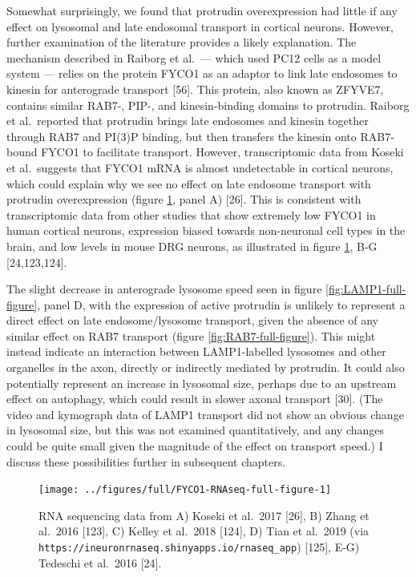 \documentclass[
  12pt,
  a4paper,
]{book}
\begin{document}
Somewhat surprisingly, we found that protrudin overexpression had little if any effect on lysosomal and late endosomal transport in cortical neurons. However, further examination of the literature provides a likely explanation. The mechanism described in Raiborg et al.~--- which used PC12 cells as a model system --- relies on the protein FYCO1 as an adaptor to link late endosomes to kinesin for anterograde transport {[}56{]}. This protein, also known as ZFYVE7, contains similar RAB7-, PIP-, and kinesin-binding domains to protrudin. Raiborg et al.~reported that protrudin brings late endosomes and kinesin together through RAB7 and PI(3)P binding, but then transfers the kinesin onto RAB7-bound FYCO1 to facilitate transport. However, transcriptomic data from Koseki et al.~suggests that FYCO1 mRNA is almost undetectable in cortical neurons, which could explain why we see no effect on late endosome transport with protrudin overexpression (figure \ref{fig:FYCO1-RNAseq-full-figure}, panel A) {[}26{]}. This is consistent with transcriptomic data from other studies that show extremely low FYCO1 in human cortical neurons, expression biased towards non-neuronal cell types in the brain, and low levels in mouse DRG neurons, as illustrated in figure \ref{fig:FYCO1-RNAseq-full-figure}, B-G {[}24,123,124{]}.

The slight decrease in anterograde lysosome speed seen in figure \ref{fig:LAMP1-full-figure}, panel D, with the expression of active protrudin is unlikely to represent a direct effect on late endosome/lysosome transport, given the absence of any similar effect on RAB7 transport (figure \ref{fig:RAB7-full-figure}). This might instead indicate an interaction between LAMP1-labelled lysosomes and other organelles in the axon, directly or indirectly mediated by protrudin. It could also potentially represent an increase in lysosomal size, perhaps due to an upstream effect on autophagy, which could result in slower axonal transport {[}30{]}. (The video and kymograph data of LAMP1 transport did not show an obvious change in lysosomal size, but this was not examined quantitatively, and any changes could be quite small given the magnitude of the effect on transport speed.) I discuss these possibilities further in subsequent chapters.




\begin{figure}
\texttt{[image: ../figures/full/FYCO1-RNAseq-full-figure-1]} \caption[FYCO1 transcriptome comparisons]{RNA sequencing data from A) Koseki et al.~2017 {[}26{]}, B) Zhang et al.~2016 {[}123{]}, C) Kelley et al.~2018 {[}124{]}, D) Tian et al.~2019 (via \texttt{https://ineuronrnaseq.shinyapps.io/rnaseq\_app}) {[}125{]}, E-G) Tedeschi et al.~2016 {[}24{]}.
\vspace{30pt}}\label{fig:FYCO1-RNAseq-full-figure}
\end{figure}
\end{document}
